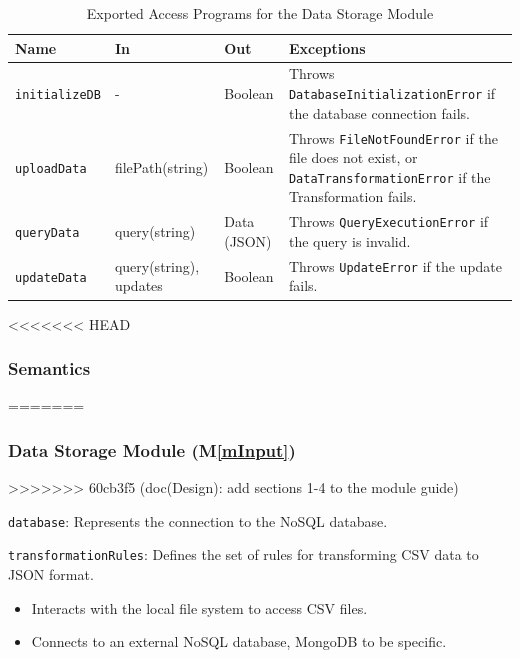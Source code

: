 \documentclass[12pt, titlepage]{article}
\newcommand{\mref}[1]{M\ref{#1}}
\begin{document}
\begin{description}
\begin{description}
  \begin{table}[h!]
    \centering
    \begin{tabular}{p{} p{} p{} p{}}
    \toprule
    \textbf{Name} & \textbf{In} & \textbf{Out} & \textbf{Exceptions}\\
    \midrule
    
    \texttt{initializeDB} & - & Boolean & Throws \texttt{DatabaseInitializationError}
    if the database connection fails.\\
    \midrule
    
    \texttt{uploadData} & filePath(string) & Boolean & Throws \texttt{FileNotFoundError}
    if the file does not exist, or \texttt{DataTransformationError} if the Transformation
    fails.\\
    \midrule

    \texttt{queryData} & query(string) & Data (JSON) & Throws \texttt{QueryExecutionError}
    if the query is invalid.\\
    \midrule

    \texttt{updateData} & query(string), updates & Boolean & Throws \texttt{UpdateError}
    if the update fails.\\
    \bottomrule
    
    \end{tabular}
    \caption{Exported Access Programs for the Data Storage Module}
    \label{TblEAP_Storage}
  \end{table}
\end{description}

<<<<<<< HEAD
\subsubsection{Semantics}
=======
\subsubsection{Data Storage Module (\mref{mInput})}

>>>>>>> 60cb3f5 (doc(Design): add sections 1-4 to the module guide)
\begin{description}
  \item[State Variables:]
  \item
  \texttt{database}: Represents the connection to the NoSQL database.
  \item
  \texttt{transformationRules}: Defines the set of rules for transforming CSV data to
  JSON format.
  \item[Environment Variables:]
  \item
  \begin{itemize}
    \item Interacts with the local file system to access CSV files.
  \end{itemize}
  \item 
  \begin{itemize}
    \item Connects to an external NoSQL database, MongoDB to be specific.
  \end{itemize}
  \item 


\end{description}
\end{description}
\end{document}
